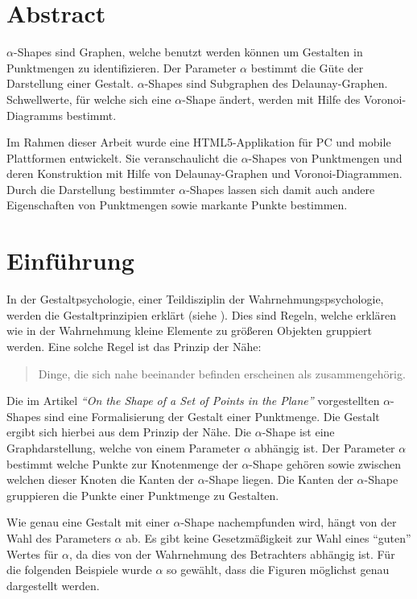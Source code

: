 
\chapter*{Abstract}

$\alpha$-Shapes sind Graphen, welche benutzt werden können um Gestalten in Punktmengen zu identifizieren. Der Parameter $\alpha$ bestimmt die Güte der Darstellung einer Gestalt. $\alpha$-Shapes sind Subgraphen des Delaunay-Graphen. Schwellwerte, für welche sich eine $\alpha$-Shape ändert, werden mit Hilfe des Voronoi-Diagramms bestimmt.

Im Rahmen dieser Arbeit wurde eine HTML5-Applikation für PC und mobile Plattformen entwickelt. Sie veranschaulicht die $\alpha$-Shapes von Punktmengen und deren Konstruktion mit Hilfe von Delaunay-Graphen und Voronoi-Diagrammen. Durch die Darstellung bestimmter $\alpha$-Shapes lassen sich damit auch andere Eigenschaften von Punktmengen sowie markante Punkte bestimmen.

\chapter{Einführung}

In der Gestaltpsychologie, einer Teildisziplin der Wahrnehmungspsychologie, werden die Gestaltprinzipien erklärt (siehe \autocite{Goldstein2008}). Dies sind Regeln, welche erklären wie in der Wahrnehmung kleine Elemente zu größeren Objekten gruppiert werden. Eine solche Regel ist das Prinzip der Nähe: \begin{quote}
Dinge, die sich nahe beeinander befinden erscheinen als zusammengehörig. 
\end{quote}

Die im Artikel \emph{"`On the Shape of a Set of Points in the Plane"'} \autocite{alpha1983} vorgestellten $\alpha$-Shapes sind eine Formalisierung der Gestalt einer Punktmenge. Die Gestalt ergibt sich hierbei aus dem Prinzip der Nähe. Die $\alpha$-Shape ist eine Graphdarstellung, welche von einem Parameter $\alpha$ abhängig ist. Der Parameter $\alpha$ bestimmt welche Punkte zur Knotenmenge der $\alpha$-Shape gehören sowie zwischen welchen dieser Knoten die Kanten der $\alpha$-Shape liegen. Die Kanten der $\alpha$-Shape gruppieren die Punkte einer Punktmenge zu Gestalten.

Wie genau eine Gestalt mit einer $\alpha$-Shape nachempfunden wird, hängt von der Wahl des Parameters $\alpha$ ab. Es gibt keine Gesetzmäßigkeit zur Wahl eines "`guten"' Wertes für $\alpha$, da dies von der Wahrnehmung des Betrachters abhängig ist. Für die folgenden Beispiele wurde $\alpha$ so gewählt, dass die Figuren möglichst genau dargestellt werden.

